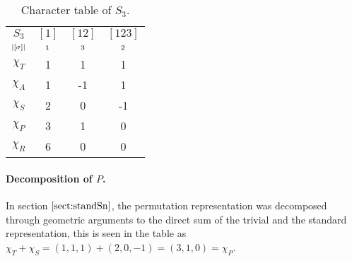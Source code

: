 \begin{table}[hbt!]
	\centering
	\begin{tabular}{c | c c c}
		$S_3$      & $[1]$   & $[12]$  & $[123]$ \\
		$\scriptstyle|[\sigma]|$ & $\scriptstyle 1$ & $\scriptstyle 3$ & $\scriptstyle 2$ \\ \hline
		$\chi_T$     & 1       & 1       & 1       \\
		$\chi_A$     & 1       & -1      & 1       \\
		$\chi_S$     & 2       & 0       & -1      \\ \hline\hline
		$\chi_P$     & 3       & 1       & 0       \\
		$\chi_R$     & 6       & 0       & 0
	\end{tabular}
	\caption{Character table of $S_3$.}
\end{table}

\paragraph{Decomposition of $P$.} In section $\ref{sect:standSn}$, the permutation representation was decomposed through geometric arguments to the direct sum of the trivial and the standard representation, this is seen in the table as $\chi_T + \chi_S = (1,1,1) + (2,0,-1) = (3,1,0) = \chi_P$.%

